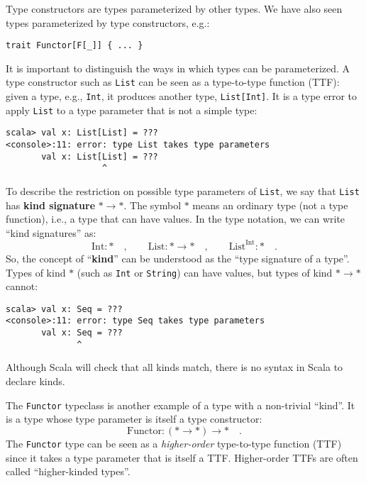 Type constructors are types parameterized by other types. We have
also seen types parameterized by type constructors, e.g.:
\begin{lstlisting}
trait Functor[F[_]] { ... }
\end{lstlisting}
It is important to distinguish the ways in which types can be parameterized.
A type constructor such as \lstinline!List! can be seen as a type-to-type
function (TTF): given a type, e.g., \lstinline!Int!, it produces
another type, \lstinline!List[Int]!. It is a type error to apply
\lstinline!List! to a type parameter that is not a simple type:
\begin{lstlisting}
scala> val x: List[List] = ???
<console>:11: error: type List takes type parameters
       val x: List[List] = ???
                   ^
\end{lstlisting}
To describe the restriction on possible type parameters of \lstinline!List!,
we say that \lstinline!List! has \textbf{kind signature}
$*\rightarrow*$. The symbol $*$ means an ordinary type (not a type
function), i.e., a type that can have values. In the type notation,
we can write \textsf{``}kind signatures\textsf{''} as:
\[
\text{Int}:*\quad,\quad\quad\text{List}:*\rightarrow*\quad,\quad\quad\text{List}^{\text{Int}}:*\quad.
\]
So, the concept of \textsf{``}\textbf{kind}\textsf{''} can be understood as the \textsf{``}type
signature of a type\textsf{''}. Types of kind $*$ (such as \lstinline!Int!
or \lstinline!String!) can have values, but types of kind $*\rightarrow*$
cannot:
\begin{lstlisting}
scala> val x: Seq = ???
<console>:11: error: type Seq takes type parameters
       val x: Seq = ???
              ^
\end{lstlisting}
Although Scala will check that all kinds match, there is no syntax
in Scala to declare kinds.

The \lstinline!Functor! typeclass is another example of a type with
a non-trivial \textsf{``}kind\textsf{''}. It is a type whose type parameter is itself
a type constructor:
\[
\text{Functor}:(*\rightarrow*)\rightarrow*\quad.
\]
The \lstinline!Functor! type can be seen as a \emph{higher-order}
type-to-type function (TTF) since it takes a type parameter that is
itself a TTF. Higher-order TTFs
are often called \textsf{``}higher-kinded types\textsf{''}.

